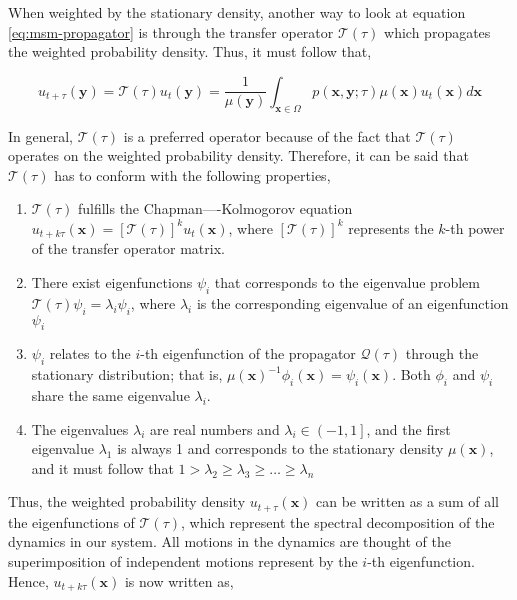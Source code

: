 \begin{spacing}{2.0}
    When weighted by the stationary density, another way to look at equation \ref{eq:msm-propagator} is through the transfer operator $\mathcal{T}(\tau)$
    which propagates the weighted probability density. Thus, it must follow that,

    \begin{equation}
        u_{t+\tau}(\mathbf{y}) = \mathcal{T}(\tau)u_t(\mathbf{y}) = \frac{1}{\mu(\mathbf{y})}
            \int_{\mathbf{x}\in\Omega}p(\mathbf{x},\mathbf{y};\tau)\mu(\mathbf{x})u_t(\mathbf{x})d\mathbf{x}
        \label{eq:msm-weighted-propagator}
    \end{equation}

    In general, $\mathcal{T}(\tau)$ is a preferred operator because of the fact that $\mathcal{T}(\tau)$ operates on the weighted probability density. 
    Therefore, it can be said that $\mathcal{T}(\tau)$ has to conform with the following properties,

    \begin{enumerate}
        \item{$\mathcal{T}(\tau)$ fulfills the Chapman—-Kolmogorov equation $u_{t+k\tau}(\mathbf{x}) = \left[\mathcal{T}(\tau)\right]^k u_t(\mathbf{x})$,
              where $\left[\mathcal{T}(\tau)\right]^k$ represents the $k$-th power of the transfer operator matrix.}
        \item{There exist eigenfunctions $\psi_i$ that corresponds to the eigenvalue problem $\mathcal{T}(\tau)\psi_i = \lambda_i\psi_i$, where
              $\lambda_i$ is the corresponding eigenvalue of an eigenfunction $\psi_i$}
        \item{$\psi_i$ relates to the $i$-th eigenfunction of the propagator $\mathcal{Q}(\tau)$ through the stationary distribution; that is, 
              $\mu(\mathbf{x})^{-1}\phi_i(\mathbf{x}) = \psi_i(\mathbf{x})$. Both $\phi_i$ and $\psi_i$ share the same eigenvalue $\lambda_i$.}
        \item{The eigenvalues $\lambda_i$ are real numbers and $\lambda_i \in \left(-1,1\right]$, and the first eigenvalue $\lambda_1$ is always 1 and 
              corresponds to the stationary density $\mu(\mathbf{x})$, and it must follow that $1 > \lambda_2 \geq \lambda_3 \geq \ldots \geq \lambda_n$}
    \end{enumerate}

    Thus, the weighted probability density $u_{t+\tau}(\mathbf{x})$ can be written as a sum of all the eigenfunctions of $\mathcal{T}(\tau)$, which 
    represent the spectral decomposition of the dynamics in our system. All motions in the dynamics are thought of the superimposition of 
    independent motions represent by the $i$-th eigenfunction. Hence, $u_{t+k\tau}(\mathbf{x})$ is now written as,


\end{spacing}
